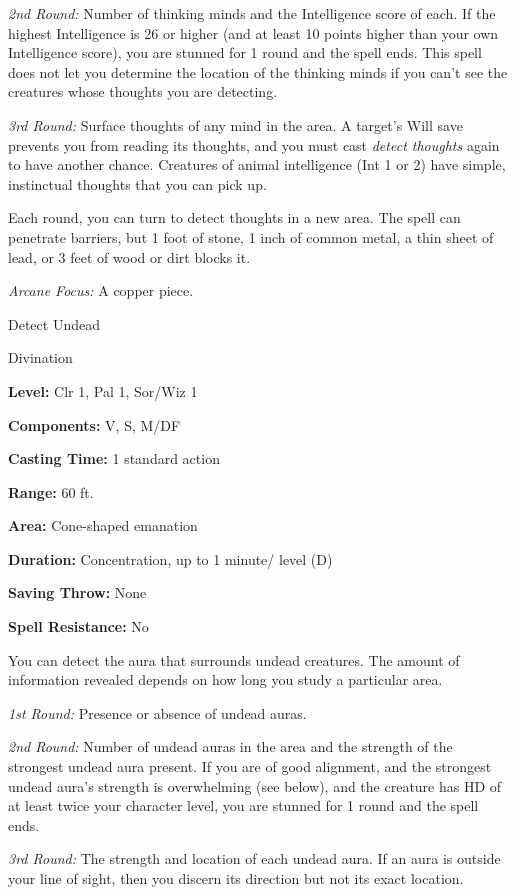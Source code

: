 \documentclass{article}
\begin{document}
\textit{2nd Round: }Number of thinking minds and the Intelligence score of each. 
If the highest Intelligence is 26 or higher (and at least 10 points higher than 
your own Intelligence score), you are stunned for 1 round and the spell ends. This 
spell does not let you determine the location of the thinking minds if you can't 
see the creatures whose thoughts you are detecting.

\textit{3rd Round: }Surface thoughts of any mind in the area. A target's Will save 
prevents you from reading its thoughts, and you must cast \textit{detect thoughts 
}again to have another chance. Creatures of animal intelligence (Int 1 or 2) have 
simple, instinctual thoughts that you can pick up.

Each round, you can turn to detect thoughts in a new area. The spell can penetrate 
barriers, but 1 foot of stone, 1 inch of common metal, a thin sheet of lead, or 
3 feet of wood or dirt blocks it.

\textit{Arcane Focus: }A copper piece.

\vspace{12pt}
Detect Undead

Divination

\textbf{Level:} Clr 1, Pal 1, Sor/Wiz 1

\textbf{Components:} V, S, M/DF

\textbf{Casting Time:} 1 standard action

\textbf{Range:} 60 ft.

\textbf{Area:} Cone-shaped emanation

\textbf{Duration:} Concentration, up to 1 minute/ level (D)

\textbf{Saving Throw:} None

\textbf{Spell Resistance:} No

You can detect the aura that surrounds undead creatures. The amount of information 
revealed depends on how long you study a particular area.

\textit{1st Round: }Presence or absence of undead auras.

\textit{2nd Round: }Number of undead auras in the area and the strength of the 
strongest undead aura present. If you are of good alignment, and the strongest 
undead aura's strength is overwhelming (see below), and the creature has HD of 
at least twice your character level, you are stunned for 1 round and the spell 
ends.

\textit{3rd Round: }The strength and location of each undead aura. If an aura is 
outside your line of sight, then you discern its direction but not its exact location.
\end{document}
